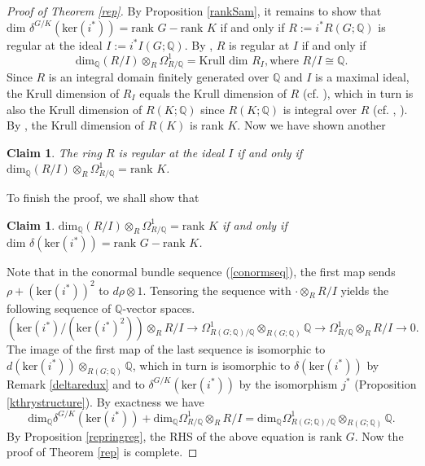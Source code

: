 \documentclass[11pt]{amsart}
\theoremstyle{plain}
\newtheorem{claim}[theorem]{Claim}
\newtheorem{proposition}[theorem]{Proposition}
\theoremstyle{definition}
\begin{document}
	\begin{proof}[Proof of Theorem \ref{rep}]
	By Proposition \ref{rankSam}, it remains to show that $\text{dim }\delta^{G/K}(\text{ker}(i^*))=\text{rank }G-\text{rank }K$ if and only if $R:=i^*R(G; \mathbb{Q})$ is regular at the ideal $I:=i^*I(G; \mathbb{Q})$. By \cite[Corollary 3.7]{ABC+}, $R$ is regular at $I$ if and only if 
	\[\text{dim}_\mathbb{Q}(R/I)\otimes_R \Omega^1_{R/\mathbb{Q}}=\text{Krull dim }R_I, \text{where }R/I\cong\mathbb{Q}.\]
	Since $R$ is an integral domain finitely generated over $\mathbb{Q}$ and $I$ is a maximal ideal, the Krull dimension of $R_I$ equals the Krull dimension of $R$ (cf. \cite[Corollary 11.27]{AM}), which in turn is also the Krull dimension of $R(K; \mathbb{Q})$ since $R(K; \mathbb{Q})$ is integral over $R$ (cf. \cite[Proposition 3.2]{Se}, \cite[Remark, p.60]{AM}). By \cite[Lemma 7.12]{CFok}, the Krull dimension of $R(K)$ is rank $K$. Now we have shown another
	\begin{claim}
		The ring $R$ is regular at the ideal $I$ if and only if $\text{dim}_\mathbb{Q}(R/I)\otimes_R\Omega^1_{R/\mathbb{Q}}=\text{rank }K$. 
	\end{claim}
	To finish the proof, we shall show that 
	\begin{claim}
		$\text{dim}_\mathbb{Q}(R/I)\otimes_R\Omega^1_{R/\mathbb{Q}}=\text{rank }K$ if and only if $\text{dim }\delta(\text{ker}(i^*))=\text{rank }G-\text{rank }K$.
	\end{claim} 
	Note that in the conormal bundle sequence (\ref{conormseq}), the first map sends $\rho+(\text{ker}(i^*))^2$ to $d\rho\otimes 1$. Tensoring the sequence with $\cdot\otimes_R R/I$ yields the following sequence of $\mathbb{Q}$-vector spaces.
	\[(\text{ker}(i^*)/(\text{ker}(i^*)^2))\otimes_R R/I\longrightarrow\Omega^1_{R(G; \mathbb{Q})/\mathbb{Q}}\otimes_{R(G; \mathbb{Q})}\mathbb{Q}\longrightarrow\Omega^1_{R/\mathbb{Q}}\otimes_R R/I\longrightarrow 0.\]
	The image of the first map of the last sequence is isomorphic to $d(\text{ker}(i^*))\otimes_{R(G; \mathbb{Q})}\mathbb{Q}$, which in turn is isomorphic to $\delta(\text{ker}(i^*))$ by Remark \ref{deltaredux} and to $\delta^{G/K}(\text{ker}(i^*))$ by the isomorphism $j^*$ (Proposition \ref{kthrystructure}). By exactness we have 
	\[\text{dim}_\mathbb{Q}\delta^{G/K}(\text{ker}(i^*))+\text{dim}_\mathbb{Q}\Omega^1_{R/\mathbb{Q}}\otimes_R R/I=\text{dim}_\mathbb{Q}\Omega^1_{R(G; \mathbb{Q})/\mathbb{Q}}\otimes_{R(G; \mathbb{Q})}\mathbb{Q}.\]
	By Proposition \ref{repringreg}, the RHS of the above equation is $\text{rank }G$. 
	Now the proof of Theorem \ref{rep} is complete. 
\end{proof}
\end{document}
